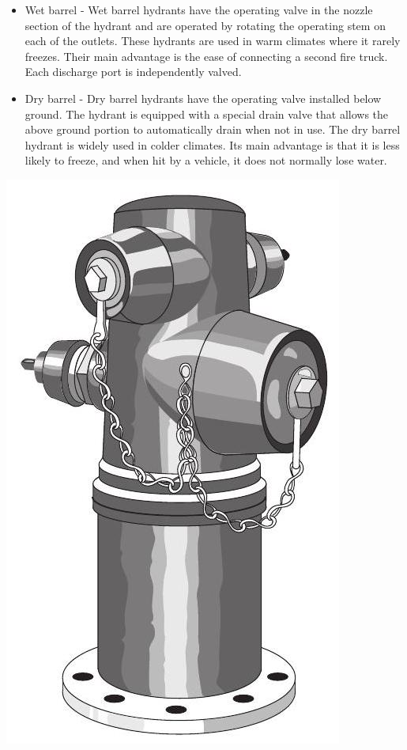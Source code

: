 \documentclass[10pt]{article}
\begin{document}
\begin{itemize}
  \item Wet barrel - Wet barrel hydrants have the operating valve in the nozzle section of the hydrant and are operated by rotating the operating stem on each of the outlets. These hydrants are used in warm climates where it rarely freezes. Their main advantage is the ease of connecting a second fire truck. Each discharge port is independently valved.

  \item Dry barrel - Dry barrel hydrants have the operating valve installed below ground. The hydrant is equipped with a special drain valve that allows the above ground portion to automatically drain when not in use. The dry barrel hydrant is widely used in colder climates. Its main advantage is that it is less likely to freeze, and when hit by a vehicle, it does not normally lose water.

\end{itemize}
\includegraphics[max width=\textwidth]{WetBarrellFireHydrant}
\end{document}
